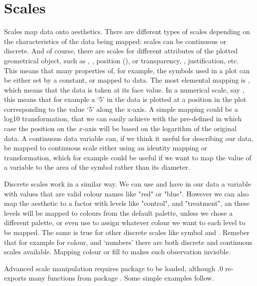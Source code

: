 \documentclass[paper=a4,headsepline,BCOR=12mm,twoside,open=right,%
titlepage,headings=small,fontsize=10pt,index=totoc,bibliography=totoc,%
captions=tableheading,captions=nooneline]{scrbook}\usepackage{knitr}
\begin{document}
\section{Scales}

Scales map data onto aesthetics. There are different types of scales depending on the characteristics of the data being mapped: scales can be continuous or discrete. And of course, there are scales for different attributes of the plotted geometrical object, such as , , position (),  or transparency, , justification, etc. This means that many properties of, for example, the symbols used in a plot can be either set by a constant, or mapped to data. The most elemental mapping is , which means that the data is taken at its face value. In a numerical scale, say , this means that for example a `5' in the data is plotted at a position in the plot corresponding to the value `5' along the x-axis. A simple mapping could be a log10 transformation, that we can easily achieve with the pre-defined  in which case the position on the $x$-axis will be based on the logarithm of the original data. A continuous data variable can, if we think it useful for describing our data, be mapped to continuous scale either using an identity mapping or transformation, which for example could be useful if we want to map the value of a variable to the area of the symbol rather than its diameter.

Discrete scales work in a similar way. We can use  and have in our data a variable with values that are valid colour names like "red" or "blue". However we can also map the  aesthetic to a factor with levels like "control", and "treatment", an these levels will be mapped to colours from the default palette, unless we chose a different palette, or even use  to assign whatever colour we want to each level to be mapped. The same is true for other discrete scales like symbol  and . Remeber that for example for colour, and `numbers' there are both discrete and continuous scales available. Mapping colour or fill to  makes such observation invisible.

Advanced scale manipulation requires package  to be loaded, although .0 re-exports many functions from package . Some simple examples follow.
\end{document}
